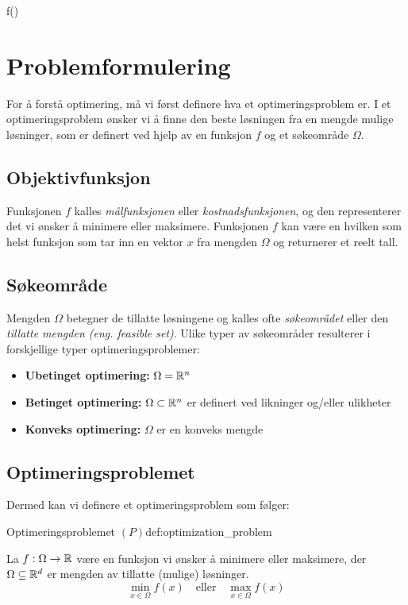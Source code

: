 \begin{mini!}{}{f()}{}{}
\label{eq:opt_problem}
\end{mini!}

\section{Problemformulering}
\label{sec:problem_formulation}
For å forstå optimering, må vi først definere hva et optimeringsproblem er.
I et optimeringsproblem ønsker vi å finne den beste løsningen fra en mengde mulige løsninger, som er definert ved hjelp av en funksjon \(f\) og et søkeområde \(\Omega\).

\subsection{Objektivfunksjon}
Funksjonen \(f\) kalles \emph{mål\-funksjonen} eller \emph{kostnads\-funksjonen}, og den representerer det vi ønsker å minimere eller maksimere.
Funksjonen \(f\) kan være en hvilken som helst funksjon som tar inn en vektor \(x\) fra mengden \(\Omega\) og returnerer et reelt tall.

\subsection{Søkeområde}
Mengden \(\Omega\) betegner de tillatte løsningene og kalles ofte \emph{søkeområdet} eller den \emph{tillatte mengden (eng. feasible set)}.
Ulike typer av søkeområder resulterer i forskjellige typer optimeringsproblemer:
\begin{itemize}
	\item \textbf{Ubetinget optimering:} \(\Omega = \mathbb{R}^n\)
	\item \textbf{Betinget optimering:} \(\Omega \subset \mathbb{R}^n\) er definert ved likninger og/eller ulikheter
	\item \textbf{Konveks optimering:} \(\Omega\) er en konveks mengde
\end{itemize}

\subsection{Optimeringsproblemet}
Dermed kan vi definere et optimeringsproblem som følger:
\begin{definition}{Optimeringsproblemet \((P)\)}{def:optimization_problem}

	La \(f: \Omega \to \mathbb{R}\) være en funksjon vi ønsker å minimere eller maksimere, der \(\Omega \subseteq \mathbb{R}^d\) er mengden av tillatte (mulige) løsninger.
	\[
		\min_{x \in \Omega} f(x) \quad \text{eller} \quad \max_{x \in \Omega} f(x) \tag{P}
	\]
\end{definition}

